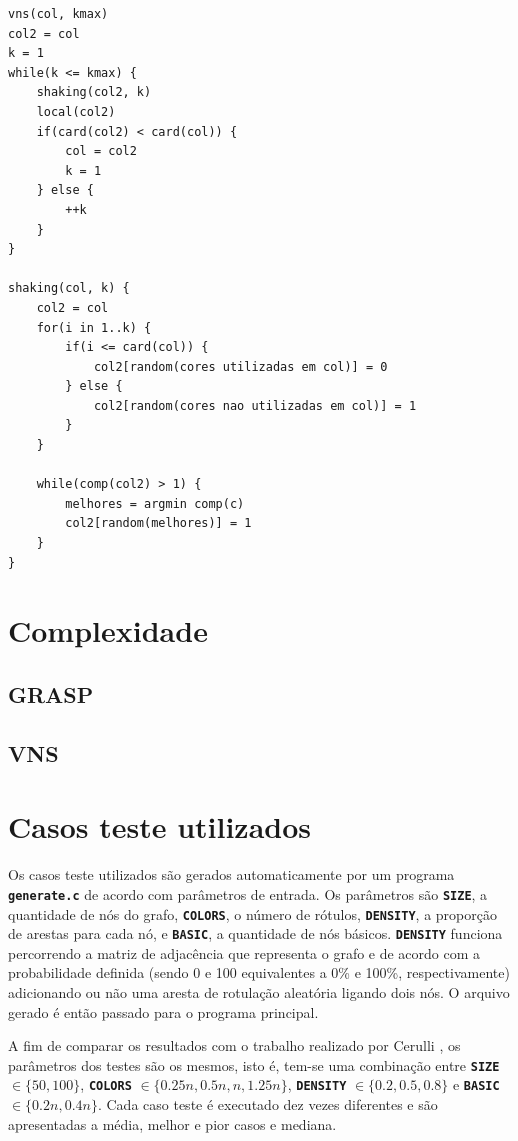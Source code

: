 \documentclass[12pt, a4paper]{article}
\newcommand{\ic}[1]{\textbf{\lstinline{#1}}}
\begin{document}
\begin{lstlisting}[caption=Pseudocódigo para VNS, basicstyle=\ttfamily\scriptsize]
vns(col, kmax)
col2 = col
k = 1
while(k <= kmax) {
    shaking(col2, k)
    local(col2)
    if(card(col2) < card(col)) {
        col = col2
        k = 1
    } else {
        ++k
    }
}

shaking(col, k) {
    col2 = col
    for(i in 1..k) {
        if(i <= card(col)) {
            col2[random(cores utilizadas em col)] = 0
        } else {
            col2[random(cores nao utilizadas em col)] = 1
        }
    }

    while(comp(col2) > 1) {
        melhores = argmin comp(c)
        col2[random(melhores)] = 1
    }
}
\end{lstlisting}

\section{Complexidade}
\subsection{GRASP}
\subsection{VNS}

\section{Casos teste utilizados}
Os casos teste utilizados são gerados automaticamente por um programa
\ic{generate.c} de acordo com parâmetros de entrada. Os parâmetros são
\ic{SIZE}, a quantidade de nós do grafo, \ic{COLORS}, o número de rótulos,
\ic{DENSITY}, a proporção de arestas para cada nó, e \ic{BASIC}, a quantidade
de nós básicos. \ic{DENSITY} funciona percorrendo a matriz de adjacência que
representa o grafo e de acordo com a probabilidade definida (sendo 0 e 100
equivalentes a 0\% e 100\%, respectivamente) adicionando ou não uma aresta de
rotulação aleatória ligando dois nós. O arquivo gerado é então passado para o
programa principal.

A fim de comparar os resultados com o trabalho realizado por Cerulli
\cite{cerulli}, os parâmetros dos testes são os mesmos, isto é, tem-se uma
combinação entre \ic{SIZE} $ \in \{50, 100\} $, \ic{COLORS} $ \in \{0.25n,
0.5n, n, 1.25n\} $, \ic{DENSITY} $ \in \{0.2, 0.5, 0.8\}$ e \ic{BASIC} $ \in
\{0.2n, 0.4n\} $. Cada caso teste é executado dez vezes diferentes e são
apresentadas a média, melhor e pior casos e mediana.
\end{document}

